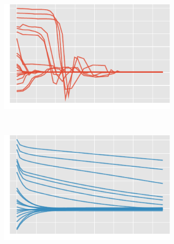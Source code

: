 \begin{figure}[htb]
\begin{subfigure}[t]{0.5\textwidth}
    \end{subfigure}%
    \begin{subfigure}[t]{0.5\textwidth}%
    	\centering%
		\includegraphics[width=\textwidth]{img/ballistic_bf_uy}%
    \end{subfigure}\\%
    \begin{subfigure}[t]{0.5\textwidth}%
    	\centering%
    	\includegraphics[width=\textwidth]{img/ballistic_em_ux}%
    \end{subfigure}%
    \begin{subfigure}[t]{0.5\textwidth}%
    	\centering%

\end{subfigure}
\end{figure}
